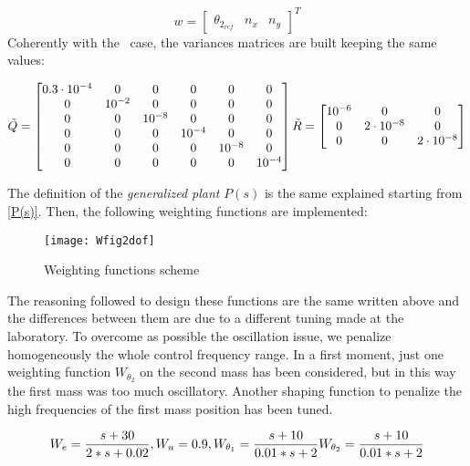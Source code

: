 \begin{equation}
	w =
	\begin{bmatrix}
		\theta_{2_{ref}} & n_x & n_y
	\end{bmatrix}^T
\end{equation}
Coherently with the \onedof~case, the variances matrices are built keeping the same values:

\begin{equation}
	\tilde{Q}=
	\begin{bmatrix}
		0.3\cdot10^{-4} & 0 & 0 & 0 & 0 & 0\\
		0 & 10^{-2} & 0 & 0 & 0 & 0\\
		0 & 0 & 10^{-8} & 0 & 0 & 0 \\
		0 & 0 & 0 & 10^{-4} & 0 & 0 \\
		0 & 0 & 0 & 0 & 10^{-8} & 0 \\
		0 & 0 & 0 & 0 & 0 & 10^{-4}
	\end{bmatrix}
	\\
	\tilde{R}=
	\begin{bmatrix}
		10^{-6} & 0 & 0\\
		0 & 2\cdot10^{-8} & 0 \\
		0 & 0 & 2\cdot10^{-8} 
	\end{bmatrix}	
\end{equation}

The definition of the \textit{generalized plant} $P(s)$ is the same explained starting from \cref{P(s)}. Then, the following weighting functions are implemented:

\begin{figure*}[h]
	\centering
	\texttt{[image: Wfig2dof]}
	\caption{Weighting functions scheme}
	\label{Weighting functions scheme2dof}
\end{figure*}

The reasoning followed to design these functions are the same written above and the differences between them are due to a different tuning made at the laboratory. To overcome as possible the oscillation issue, we penalize homogeneously the whole control frequency range. In a first moment, just one weighting function $W_{\theta_{2}}$ on the second mass has been considered, but in this way the first mass was too much oscillatory. Another shaping function to penalize the high frequencies of the first mass position has been tuned.

\begin{equation}
	W_e=
	\frac{s+30}{2*s+0.02}
	\\
	,
	\\
	W_u=0.9
	\\
	,
	\\
	W_{\theta_{1}}=
	\frac{s+10}{0.01*s+2}
	\\
	W_{\theta_{2}}=
	\frac{s+10}{0.01*s+2}
\end{equation}

